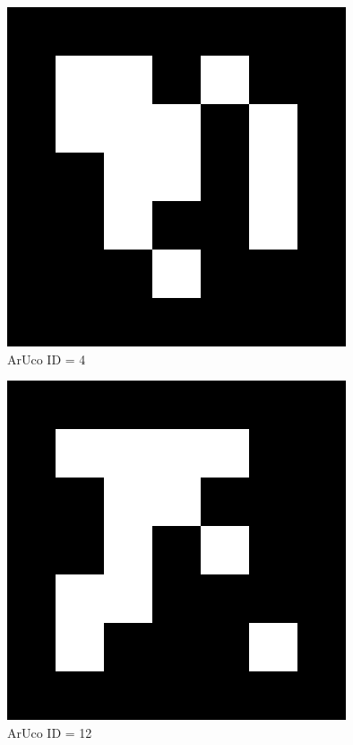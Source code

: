 \documentclass[1pt]{article}
\begin{document}
\begin{figure}[ht]
    \centering
    \includegraphics{ArUco/5x5_1000-4.png}
    \caption{ArUco ID = 4}
\end{figure}
\clearpage
\begin{figure}[ht]
    \centering
    \includegraphics{ArUco/5x5_1000-12.png}
    \caption{ArUco ID = 12}
\end{figure}
\clearpage
\end{document}
